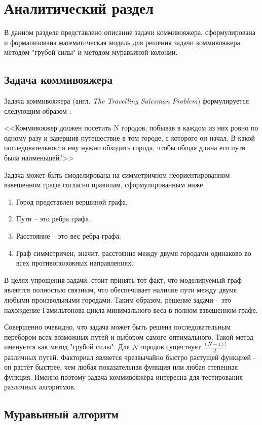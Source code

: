 \chapter{Аналитический раздел}\label{sec:analyth}
В данном разделе представлено описание задачи коммивояжера, сформулирована и формализована математическая модель для решения задачи коммивояжера методом "грубой силы" и методом муравьиной колонии.
\section{Задача коммивояжера}

Задача коммивояжера (англ. \textit{The Travelling Salesman Problem}) формулируется следующим образом \cite{tsp}:


<<Коммивояжер должен посетить N городов, побывав в каждом из них ровно по одному разу и завершив путешествие в том городе, с которого он начал. В какой последовательности ему нужно обходить города, чтобы общая длина его пути была наименьшей?>>


Задача может быть смоделирована на симметричном неориентированном взвешенном графе согласно правилам, сформулированным ниже.
\begin{enumerate}
	\item Город представлен вершиной графа.
	\item Пути -- это ребра графа.
	\item Расстояние -- это вес ребра графа.
	\item Граф симметричен, значит, расстояние между двумя городами одинаково во всех противоположных направлениях.
\end{enumerate}

В целях упрощения задачи, стоит принять тот факт, что моделируемый граф является полностью связным, что обеспечивает наличие пути между двумя любыми произвольными городами. Таким образом, решение задачи -- это нахождение Гамильтонова цикла минимального веса в полном взвешенном графе.

Совершенно очевидно, что задача может быть решена последовательным перебором всех возможных путей и выбором самого оптимального. Такой метод именуется как метод "грубой силы". Для $N$ городов существует $\frac{\left(N - 1\right)!}{2}$ различных путей. Факториал является чрезвычайно быстро растущей функцией -- он растёт быстрее, чем любая показательная функция или любая степенная функция. Именно поэтому задача коммивояжёра интересна для тестирования различных алгоритмов. 

\section{Муравьиный алгоритм}
